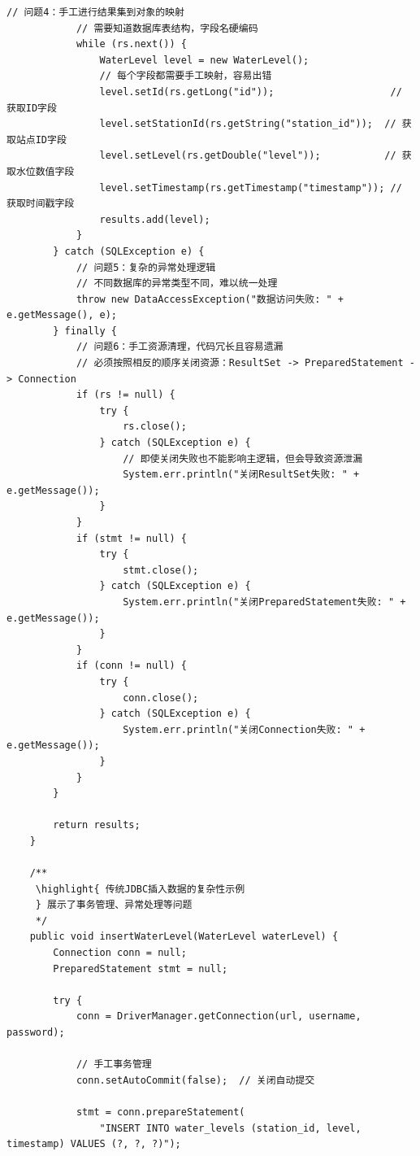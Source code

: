 \begin{lstlisting}[style=java]
            // 问题4：手工进行结果集到对象的映射
            // 需要知道数据库表结构，字段名硬编码
            while (rs.next()) {
                WaterLevel level = new WaterLevel();
                // 每个字段都需要手工映射，容易出错
                level.setId(rs.getLong("id"));                    // 获取ID字段
                level.setStationId(rs.getString("station_id"));  // 获取站点ID字段
                level.setLevel(rs.getDouble("level"));           // 获取水位数值字段
                level.setTimestamp(rs.getTimestamp("timestamp")); // 获取时间戳字段
                results.add(level);
            }
        } catch (SQLException e) {
            // 问题5：复杂的异常处理逻辑
            // 不同数据库的异常类型不同，难以统一处理
            throw new DataAccessException("数据访问失败: " + e.getMessage(), e);
        } finally {
            // 问题6：手工资源清理，代码冗长且容易遗漏
            // 必须按照相反的顺序关闭资源：ResultSet -> PreparedStatement -> Connection
            if (rs != null) {
                try { 
                    rs.close(); 
                } catch (SQLException e) {
                    // 即使关闭失败也不能影响主逻辑，但会导致资源泄漏
                    System.err.println("关闭ResultSet失败: " + e.getMessage());
                }
            }
            if (stmt != null) {
                try { 
                    stmt.close(); 
                } catch (SQLException e) {
                    System.err.println("关闭PreparedStatement失败: " + e.getMessage());
                }
            }
            if (conn != null) {
                try { 
                    conn.close(); 
                } catch (SQLException e) {
                    System.err.println("关闭Connection失败: " + e.getMessage());
                }
            }
        }
        
        return results;
    }
    
    /**
     \highlight{ 传统JDBC插入数据的复杂性示例
     } 展示了事务管理、异常处理等问题
     */
    public void insertWaterLevel(WaterLevel waterLevel) {
        Connection conn = null;
        PreparedStatement stmt = null;
        
        try {
            conn = DriverManager.getConnection(url, username, password);
            
            // 手工事务管理
            conn.setAutoCommit(false);  // 关闭自动提交
            
            stmt = conn.prepareStatement(
                "INSERT INTO water_levels (station_id, level, timestamp) VALUES (?, ?, ?)");
            

\end{lstlisting}
